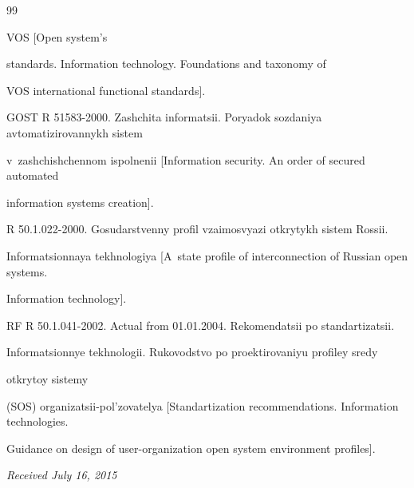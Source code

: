 {{\begin{thebibliography}{99}

 VOS [Open system's 

standards. Information technology. Foundations and taxonomy of

 VOS international functional  standards].


GOST R 51583-2000. Zashchita informatsii. Poryadok sozdaniya avtomatizirovannykh sistem 

v~zashchishchennom ispolnenii [Information security. An order of secured automated 

information systems creation]. 




R 50.1.022-2000. Gosudarstvenny profil vzaimosvyazi otkrytykh sistem Rossii. 

Informatsionnaya tekhnologiya [A~state profile of interconnection of Russian open systems. 

Information technology].






RF R 50.1.041-2002. Actual from 01.01.2004. Rekomendatsii po standartizatsii. 

Informatsionnye tekhnologii. Rukovodstvo po proektirovaniyu profiley sredy 

otkrytoy sistemy 

(SOS) organizatsii-pol'zovatelya [Standartization recommendations. Information technologies. 

Guidance on design of user-organization open system environment profiles]. 







   \end{thebibliography}

} }





\vspace*{-1pt}



\hfill{\small\textit{Received July 16, 2015}}   

      

      

      \Contr

      

      \noindent

